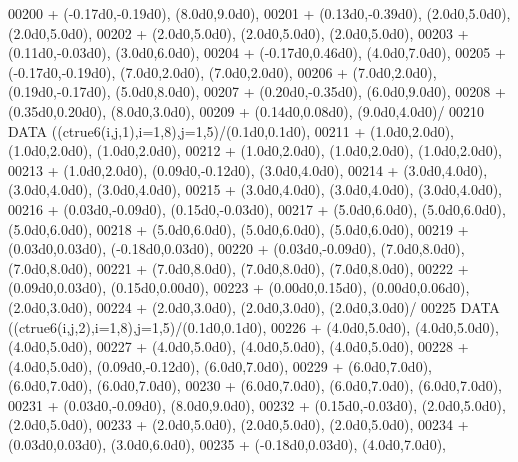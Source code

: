 \begin{DoxyCode}
00200      +                  (-0.17d0,-0.19d0), (8.0d0,9.0d0),
00201      +                  (0.13d0,-0.39d0), (2.0d0,5.0d0), (2.0d0,5.0d0),
00202      +                  (2.0d0,5.0d0), (2.0d0,5.0d0), (2.0d0,5.0d0),
00203      +                  (0.11d0,-0.03d0), (3.0d0,6.0d0),
00204      +                  (-0.17d0,0.46d0), (4.0d0,7.0d0),
00205      +                  (-0.17d0,-0.19d0), (7.0d0,2.0d0), (7.0d0,2.0d0),
00206      +                  (7.0d0,2.0d0), (0.19d0,-0.17d0), (5.0d0,8.0d0),
00207      +                  (0.20d0,-0.35d0), (6.0d0,9.0d0),
00208      +                  (0.35d0,0.20d0), (8.0d0,3.0d0),
00209      +                  (0.14d0,0.08d0), (9.0d0,4.0d0)/
00210       \textcolor{keyword}{DATA}              ((ctrue6(i,j,1),i=1,8),j=1,5)/(0.1d0,0.1d0),
00211      +                  (1.0d0,2.0d0), (1.0d0,2.0d0), (1.0d0,2.0d0),
00212      +                  (1.0d0,2.0d0), (1.0d0,2.0d0), (1.0d0,2.0d0),
00213      +                  (1.0d0,2.0d0), (0.09d0,-0.12d0), (3.0d0,4.0d0),
00214      +                  (3.0d0,4.0d0), (3.0d0,4.0d0), (3.0d0,4.0d0),
00215      +                  (3.0d0,4.0d0), (3.0d0,4.0d0), (3.0d0,4.0d0),
00216      +                  (0.03d0,-0.09d0), (0.15d0,-0.03d0),
00217      +                  (5.0d0,6.0d0), (5.0d0,6.0d0), (5.0d0,6.0d0),
00218      +                  (5.0d0,6.0d0), (5.0d0,6.0d0), (5.0d0,6.0d0),
00219      +                  (0.03d0,0.03d0), (-0.18d0,0.03d0),
00220      +                  (0.03d0,-0.09d0), (7.0d0,8.0d0), (7.0d0,8.0d0),
00221      +                  (7.0d0,8.0d0), (7.0d0,8.0d0), (7.0d0,8.0d0),
00222      +                  (0.09d0,0.03d0), (0.15d0,0.00d0),
00223      +                  (0.00d0,0.15d0), (0.00d0,0.06d0), (2.0d0,3.0d0),
00224      +                  (2.0d0,3.0d0), (2.0d0,3.0d0), (2.0d0,3.0d0)/
00225       \textcolor{keyword}{DATA}              ((ctrue6(i,j,2),i=1,8),j=1,5)/(0.1d0,0.1d0),
00226      +                  (4.0d0,5.0d0), (4.0d0,5.0d0), (4.0d0,5.0d0),
00227      +                  (4.0d0,5.0d0), (4.0d0,5.0d0), (4.0d0,5.0d0),
00228      +                  (4.0d0,5.0d0), (0.09d0,-0.12d0), (6.0d0,7.0d0),
00229      +                  (6.0d0,7.0d0), (6.0d0,7.0d0), (6.0d0,7.0d0),
00230      +                  (6.0d0,7.0d0), (6.0d0,7.0d0), (6.0d0,7.0d0),
00231      +                  (0.03d0,-0.09d0), (8.0d0,9.0d0),
00232      +                  (0.15d0,-0.03d0), (2.0d0,5.0d0), (2.0d0,5.0d0),
00233      +                  (2.0d0,5.0d0), (2.0d0,5.0d0), (2.0d0,5.0d0),
00234      +                  (0.03d0,0.03d0), (3.0d0,6.0d0),
00235      +                  (-0.18d0,0.03d0), (4.0d0,7.0d0),

\end{DoxyCode}
